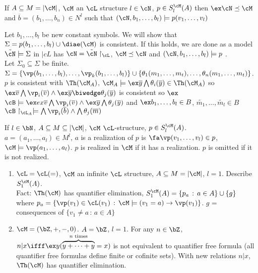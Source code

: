 \begin{proposition}
    If $A \subseteq M = | \cM|$, $\cM$ an $\cL$ structure $l \in \cN$, $p \in S_l^{\cM}(A)$ then $\ex \cN \preceq \cM$ and $\overline{b} = (b_1, \ldots, b_n) \in N^{l}$ such that $(\cN, b_1, \ldots, b_l) \models p(v_1, \ldots, v_l)$  
\end{proposition}

\begin{pf}
    Let $b_1, \ldots, b_l$ be new constant symbols. We will show that $\Sigma = p(b_1, \ldots, b_l) \cup \diae(\cM)$ is consistent. If this holds, we are done as a model $\tilde{\cN} \models \Sigma$ in $|cL$ has $\cN = \tilde{\cN} \upharpoonright_{\cL}$, $\cM \preceq \cN$ and $(\cN, b_1, \ldots, b_l) \models p$ . \\ 
    Let $\Sigma_0 \subseteq \Sigma$ be finite. $\Sigma = \{ \vp(b_1, \ldots, b_l), \ldots, \vp_k(b_1, \ldots, b_l)\} \cup \{ \theta_1(m_1, \ldots, m_t), \ldots, \theta_n(m_1, \ldots, m_t)\}$. $p$ is consistent with $\Th(\cM_A)$, $\cM_A \models \ex \overline{y} \bigwedge \theta_i(\overline{y})  \in \Th(\cM_A)$ so $\ex \overline{v} \bigwedge \vp_i(\overline{v}) \wedge \ex \overline{y} \biwedge \theta_j(\overline{y})$ is consistent so $\ex$ $\cB \models \ex ex \overline{v} \bigwedge \vp_i(\overline{v}) \wedge \ex \overline{y} \bigwedge \theta_j(\overline{y})$ and $\ex b_1, \ldots, b_l \in B$, $\tilde{m_1}, \ldots, \tilde{m_l} \in B$ $\cB \upharpoonright_{\cL_A} \models \bigwedge \vp_i(\overline{b}) \wedge \bigwedge \theta_j(\overline{m})$
\end{pf}

\begin{definition}
    If $l \in \bN$, $A \subseteq M \subseteq | \cM|$, $\cM$ $\cL$-structure, $p \in S_l^{\cM}(A)$. $a = (a_1, \ldots, a_l) \in M^l$, $a$ is a realization of $p$ is $\fa \vp(v_1, \ldots, v_l) \in p$, $\cM \models \vp(a_1, \ldots, a_l)$. $p$ is realized in $\cM$ if it has a realization. $p$ is omitted if it is not realized. 
\end{definition}

\begin{example}
    \begin{enumerate}
        \item $\cL = \cL(=)$, $\cM$ an infinite $\cL$ structure, $A \subseteq M = |\cM|$, $l=1$. Describe $S_1^{\cM}(A)$. \\
        Fact: $\Th(\cM)$ has quantifier elimination, $S_1^{\cM}(A) = \{p_a \, : \, a \in A\} \cup \{g \}$ where $p_a = \{\vp(v_1) \in \cL(v_1) \, : \, \cM \models (v_1 = a) \to \vp(v_1)\}$. $g$ = consequences of $\{v_1 \neq a \, : \, a \in A\}$ 
        \item $\cM = (\bZ, + , - , 0)$. $A = \bZ$, $l = 1$. For any $n \in \bZ$, $n|x \ifff \ex y (\overbrace{y + \cdots + y}^{n \text{ times}}=x)$ is not equivalent to quantifier free formula (all quantifier free formulas define finite or cofinite sets). With new relations $n|x$, $\Th(\cM)$ has quantifier elimination.   
    \end{enumerate}
\end{example}

